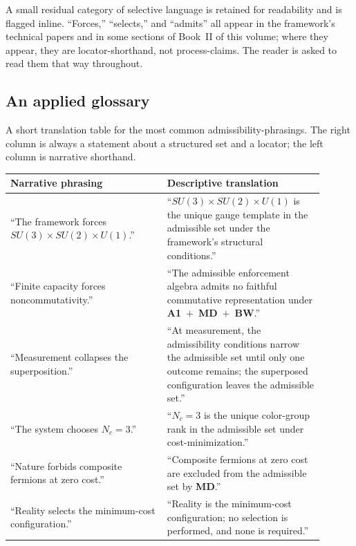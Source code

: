 \documentclass[11pt]{article}
\newcommand{\Aone}{\textbf{A1}}
\begin{document}
\noindent A small residual category of selective language is retained for readability and is flagged inline. ``Forces,'' ``selects,'' and ``admits'' all appear in the framework's technical papers and in some sections of Book~II of this volume; where they appear, they are locator-shorthand, not process-claims. The reader is asked to read them that way throughout.

\subsection{An applied glossary}\label{sec:glossary}

A short translation table for the most common admissibility-phrasings. The right column is always a statement about a structured set and a locator; the left column is narrative shorthand.

\begin{center}
\begin{tabular}{p{0.45\linewidth}p{0.45\linewidth}}
\toprule
\textbf{Narrative phrasing} & \textbf{Descriptive translation}\\
\midrule
``The framework forces $SU(3) \times SU(2) \times U(1)$.'' & ``$SU(3) \times SU(2) \times U(1)$ is the unique gauge template in the admissible set under the framework's structural conditions.''\\
\addlinespace
``Finite capacity forces noncommutativity.'' & ``The admissible enforcement algebra admits no faithful commutative representation under \Aone{}~$+$~\textbf{MD}~$+$~\textbf{BW}.''\\
\addlinespace
``Measurement collapses the superposition.'' & ``At measurement, the admissibility conditions narrow the admissible set until only one outcome remains; the superposed configuration leaves the admissible set.''\\
\addlinespace
``The system chooses $N_c = 3$.'' & ``$N_c = 3$ is the unique color-group rank in the admissible set under cost-minimization.''\\
\addlinespace
``Nature forbids composite fermions at zero cost.'' & ``Composite fermions at zero cost are excluded from the admissible set by \textbf{MD}.''\\
\addlinespace
``Reality selects the minimum-cost configuration.'' & ``Reality is the minimum-cost configuration; no selection is performed, and none is required.''\\
\bottomrule
\end{tabular}
\end{center}
\end{document}
